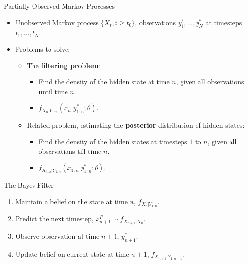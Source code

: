 \documentclass{beamer}
\begin{document}
\begin{frame}{Partially Observed Markov Processes}

    \begin{itemize}
        \item Unobserved Markov process $\{X_t, t \geq t_0\}$, observations $y_1^*,...,y_N^*$ at timesteps $t_1,..., t_N$.
        \item \pause Problems to solve:
        \begin{itemize}
            \item \pause The \textbf{filtering problem}:
            \begin{itemize}
                \item \pause Find the density of the hidden state at time $n$, given all observations until time $n$.
                \item \pause $f_{X_n|Y_{1:n}}(x_n|y_{1:n}^*;\theta)$.
            \end{itemize}
            \item \pause Related problem, estimating the \textbf{posterior} distribution of hidden states:
            \begin{itemize}
                \item \pause Find the density of the hidden states at timesteps $1$ to $n$, given all observations till time $n$. 
                \item \pause $f_{X_{1:n}|Y_{1:n}}(x_{1:n}|y_{1:n}^*;\theta)$.
            \end{itemize}
        \end{itemize}
    \end{itemize}
\end{frame}

\begin{frame}{The Bayes Filter}
    \begin{enumerate}
        \item Maintain a belief on the state at time $n$, $f_{X_{n}|Y_{1:n}}$. 
        \item \pause Predict the next timestep, $x_{n+1}^P \sim f_{X_{n+1}|X_{n}}$.
        \item \pause Observe observation at time $n+1$, $y_{n+1}^*$.
        \item \pause Update belief on current state at time $n+1$, $f_{X_{n+1}|Y_{1:n+1}}$.
    \end{enumerate}
\end{frame}
\end{document}
